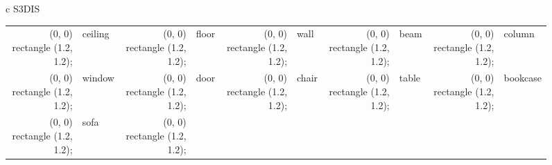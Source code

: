 \begin{figure*}[!b]
    \centering
    \begin{tabular}{c}
        \toprule
        \large{S3DIS}
        \\\midrule
        \begin{tabular}{@{}rlrlrlrlrl@{}}
            \definecolor{tempcolor}{rgb}{0.91,0.90,0.41}
            \tikz \fill[fill=tempcolor, scale=0.3, draw=black] (0, 0) rectangle (1.2, 1.2);
            & \small{ceiling} 
            &
            \definecolor{tempcolor}{rgb}{.37,0.61,0.77}
            \tikz \fill[fill=tempcolor, scale=0.3, draw=black] (0, 0) rectangle (1.2, 1.2); 
            & \small{floor}
            &
            \definecolor{tempcolor}{rgb}{0.70,0.45,0.31}
            \tikz \fill[fill=tempcolor, scale=0.3, draw=black] (0, 0) rectangle (1.2, 1.2); 
            & \small{wall}
            &
            \definecolor{tempcolor}{rgb}{0.95,.58,0.51}
            \tikz \fill[fill=tempcolor, scale=0.3, draw=black] (0, 0) rectangle (1.2, 1.2);
            & \small{beam} &
            \definecolor{tempcolor}{rgb}{0.31,0.63,.58}
            \tikz \fill[fill=tempcolor, scale=0.3, draw=black] (0, 0) rectangle (1.2, 1.2);
            & \small{column} 
            \\
            \definecolor{tempcolor}{rgb}{0.30,0.68,.32}
            \tikz \fill[fill=tempcolor, scale=0.3, draw=black] (0, 0) rectangle (1.2, 1.2); 
            & \small{window}
            &
            \definecolor{tempcolor}{rgb}{.42,0.52,0.29}
            \tikz \fill[fill=tempcolor, scale=0.3, draw=black] (0, 0) rectangle (1.2, 1.2); 
            & \small{door}
            &
            \definecolor{tempcolor}{rgb}{.16,0.19,0.39}
            \tikz \fill[fill=tempcolor, scale=0.3, draw=black] (0, 0) rectangle (1.2, 1.2);
            & \small{chair}
            &
            \definecolor{tempcolor}{rgb}{.30,0.30,0.30}
            \tikz \fill[fill=tempcolor, scale=0.3, draw=black] (0, 0) rectangle (1.2, 1.2);
            & \small{table} 
            &
            \definecolor{tempcolor}{rgb}{.88,0.20,0.20}
            \tikz \fill[fill=tempcolor, scale=0.3, draw=black] (0, 0) rectangle (1.2, 1.2); 
            & \small{bookcase}
            \\
            \definecolor{tempcolor}{rgb}{0.35,.18,0.37}
            \tikz \fill[fill=tempcolor, scale=0.3, draw=black] (0, 0) rectangle (1.2, 1.2); 
            & \small{sofa}
            &
            \definecolor{tempcolor}{rgb}{.32,0.43,.45}
            \tikz \fill[fill=tempcolor, scale=0.3, draw=black] (0, 0) rectangle (1.2, 1.2);

\end{tabular}
\end{tabular}
\end{figure*}
